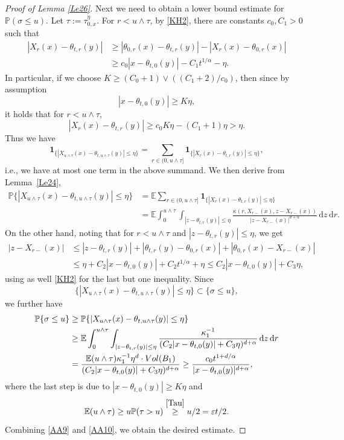 \documentclass[11pt]{article}
\newcommand{\ie}{i.e.,\xspace}
\numberwithin{equation}{section}\providecommand{\asymp}{\mathrel{\sim}}
\theoremstyle{plain}
\theoremstyle{definition}
\let\eps\varepsilon
\newcommand\mE{\mathbb{E}}
\newcommand\mP{\mathbb{P}}
\newcommand\1{{\mathbf{1}}}
\newcommand{\dif}{\,\mathrm{d}}
\begin{document}
\begin{proof}[Proof of Lemma \ref{Le26}]
Next we need to obtain a lower bound estimate for $\mP(\sigma\leq u)$. Let $\tau:=\tau^\eta_{0,x}$.
For $r<u\wedge\tau$, by \eqref{KH2},
there are constants $c_0, C_1>0$ such that
\begin{align*}
|X_{r}(x)-\theta_{t,r}(y)|&\geq|\theta_{0,r}(x)-\theta_{t,r}(y)|-|X_{r}(x)-\theta_{0,r}(x)|
\\&\geq c_0|x-\theta_{t,0}(y)|-C_1 t^{1/\alpha}-\eta.
\end{align*}
In particular, if we choose $K\geq (C_0+1)\vee ((C_1+2)/c_0)$, then since by assumption
\[
|x-\theta_{t,0}(y)|\geq K\eta,
\]
it holds that for $r<u\wedge\tau$,
\begin{equation*}
|X_{r}(x)-\theta_{t,r}(y)|\geq c_0K\eta-(C_1+1)\eta>\eta.\label{DG2}
\end{equation*}
Thus we have
\[
\1_{\{|X_{u\wedge\tau}(x)-\theta_{t,u\wedge\tau}(y)|\leq\eta\}}
=\sum_{r\in(0,u\wedge\tau]}\1_{\{|X_r(x)-\theta_{t,r}(y)|\leq\eta\}},
\]
\ie we have at most one term in the above summand. We then derive from Lemma~\ref{Le24},
\begin{align*}
\mP{\{|X_{u\wedge\tau}(x)-\theta_{t,u\wedge\tau}(y)|\leq\eta\}}
&=\mE\sum_{r\in(0,u\wedge\tau]}\1_{\{|X_r(x)-\theta_{t,r}(y)|\leq\eta\}}\\
&=\mE\int^{u\wedge\tau}_0\!\!\!\int_{|z-\theta_{t,r}(y)|\leq\eta}\frac{\kappa(r, X_{r-}(x), z-X_{r-}(x))}{|z-X_{r-}(x)|^{d+\alpha}}\dif z\dif r.
\end{align*}
On the other hand, noting that for $r<u\wedge\tau$ and $|z-\theta_{t,r}(y)|\leq\eta$, we get
\begin{align*}
|z-X_{r-}(x)|&\leq|z-\theta_{t,r}(y)|+|\theta_{t,r}(y)-\theta_{0,r}(x)|+|\theta_{0,r}(x)-X_{r-}(x)|
\\&\leq \eta+C_2|x-\theta_{t,0}(y)|+C_2 t^{1/\alpha}+\eta\leq C_2|x-\theta_{t,0}(y)|+C_3\eta,
\end{align*}
using as well \eqref{KH2} for the last but one inequality. Since
\[
\{|X_{u\wedge\tau}(x)-\theta_{t,u\wedge\tau}(y)|\leq\eta\}\subset \{\sigma\leq u\},
\]
we further have
\begin{equation}
\begin{aligned}
\mP\{\sigma\leq u\}&\geq \mP{\{|X_{u\wedge\tau}(x)-\theta_{t,u\wedge\tau}(y)|\leq\eta\}}\\
&\geq\mE\int^{u\wedge\tau}_0\int_{|z-\theta_{t,r}(y)|\leq\eta}\frac{\kappa_1^{-1}}
{(C_2|x-\theta_{t,0}(y)|+C_3\eta)^{d+\alpha}}\dif z\dif r
\\&=\frac{\mE(u\wedge\tau)\kappa_1^{-1}\eta^d\cdot {\rm Vol}(B_1)}{(C_2|x-\theta_{t,0}(y)|+C_3\eta)^{d+\alpha}}
\geq\frac{c_0 t^{1+d/\alpha}}{|x-\theta_{t,0}(y)|^{d+\alpha}},\label{AA10}
\end{aligned}
\end{equation}
where the last step is due to $|x-\theta_{t,0}(y)|\geq K\eta$ and
\[
\mE (u\wedge\tau)\geq u\mP(\tau>u)\stackrel{\eqref{Tau}}{\geq} u/2=\eps t/2.
\]
Combining \eqref{AA9} and \eqref{AA10}, we obtain the desired estimate.
\end{proof}
\end{document}
